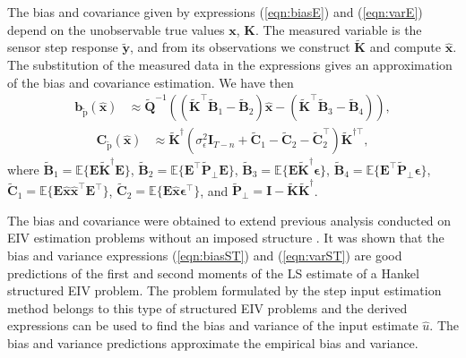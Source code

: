 The bias and covariance given by expressions (\ref{eqn:biasE}) and (\ref{eqn:varE}) depend on the unobservable true values $\mathbf{x}$, $\mathbf{K}$.
The measured variable is the sensor step response $\widetilde{\mathbf{y}}$, and from its observations we construct $\widetilde{\mathbf{K}}$ and compute $\widehat{\mathbf{x}}$.
The substitution of the measured data in the expressions gives an approximation of the bias and covariance estimation.
We have then
\begin{equation} \begin{aligned} \mathbf{b}_{\widetilde{\mathrm{p}}} \left( \widehat{\mathbf{x}} \right) & \approx \widetilde{\mathbf{Q}}^{-1} \left(  \left( \widetilde{\mathbf{K}}^\top \widetilde{\mathbf{B}}_1 - \widetilde{\mathbf{B}}_2 \right) \widehat{\mathbf{x}} - \left( \widetilde{\mathbf{K}}^\top \widetilde{\mathbf{B}}_3 - \widetilde{\mathbf{B}}_4 \right) \right), \end{aligned} \label{eqn:biasST} \end{equation}
\begin{equation} \begin{aligned} \mathrm{\mathbf{C}}_{\widetilde{\mathrm{p}}} \left( \widehat{\mathbf{x}} \right) & \approx \widetilde{\mathbf{K}}^\dagger \left( \sigma_{\epsilon}^2 \mathbf{I}_{T-n} + \widetilde{\mathbf{C}}_1 - \widetilde{\mathbf{C}}_2 - \widetilde{\mathbf{C}}_2^\top \right) \widetilde{\mathbf{K}}^{\dagger \top}, \end{aligned} \label{eqn:varST} \end{equation}
where $\widetilde{\mathbf{B}}_1 = \mathbb{E} \Big\{ \mathbf{E} \widetilde{\mathbf{K}}^\dagger \mathbf{E} \Big\}$, $\widetilde{\mathbf{B}}_2 = \mathbb{E} \Big\{ \mathbf{E}^\top \widetilde{\mathbf{P}}_\perp \mathbf{E} \Big\}$, $\widetilde{\mathbf{B}}_3 = \mathbb{E} \Big\{ \mathbf{E} \widetilde{\mathbf{K}}^\dagger \bm{\epsilon} \Big\}$, $\widetilde{\mathbf{B}}_4 = \mathbb{E} \Big\{ \mathbf{E}^\top \widetilde{\mathbf{P}}_\perp \bm{\epsilon} \Big\}$, $\widetilde{\mathbf{\mathbf{C}}}_1 = \mathbb{E} \Big\{ \mathbf{E} \widehat{\mathbf{x}} \widehat{\mathbf{x}}^\top \mathbf{E}^\top \Big\}$, $\widetilde{\mathbf{C}}_2 = \mathbb{E} \Big\{ \mathbf{E} \widehat{\mathbf{x}} \bm{\epsilon}^\top \Big\}$, and $\widetilde{\mathbf{P}}_\perp = \mathbf{I} - \widetilde{\mathbf{K}} \widetilde{\mathbf{K}}^\dagger$. 

The bias and covariance were obtained to extend previous analysis conducted on EIV estimation problems without an imposed structure \cite{Vaccaro94, Stewart90SPT}.
It was shown that the bias and variance expressions (\ref{eqn:biasST}) and (\ref{eqn:varST}) are good predictions of the first and second moments of the LS estimate of a Hankel structured EIV problem.
The problem formulated by the step input estimation method belongs to this type of structured EIV problems and the derived expressions can be used to find the bias and variance of the input estimate $\widehat{u}$.
The bias and variance predictions approximate the empirical bias and variance.

